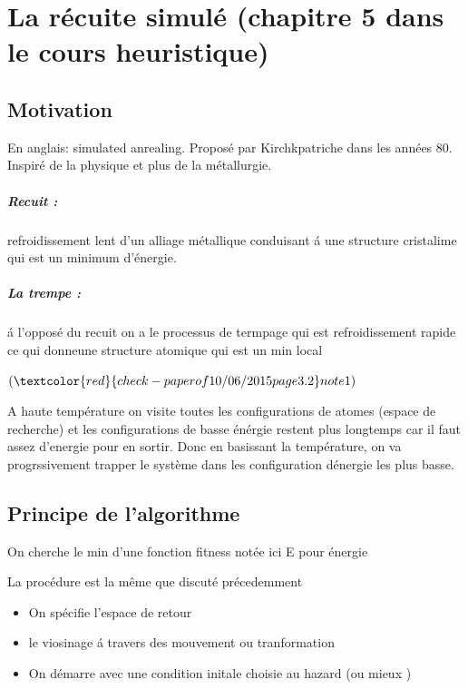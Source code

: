 \chapter{La r\'ecuite simul\'e (chapitre 5 dans le cours heuristique)}

\section{Motivation}

En anglais: simulated anrealing. 
Propos\'e par Kirchkpatriche dans les ann\'ees 80.
Inspir\'e de la physique et plus de la m\'etallurgie.

\paragraph{Recuit :}
refroidissement lent d'un alliage m\'etallique conduisant \'a une structure cristalime qui est un minimum d'\'energie.

\paragraph{La trempe :} \'a l'oppos\'e du recuit on a le processus de termpage qui est refroidissement rapide ce qui donneune structure atomique qui est un min local 


$(\textcolor{red}{check- paper of 10/06/2015 page 3.2 } note 1)$ 

A haute temp\'erature on visite toutes les configurations de atomes (espace de recherche) et les configurations de basse \'en\'ergie restent plus longtemps car il faut assez d'energie pour en sortir.
Donc en basissant la temp\'erature, on va progrssivement trapper le syst\`eme dans les configuration d\'energie les plus basse.

\section{Principe de l'algorithme}
On cherche le min d'une fonction fitness not\'ee ici E pour \'energie

La proc\'edure est la m\^eme que discut\'e pr\'ecedemment 
\begin{itemize}
\item[\textbullet] On sp\'ecifie l'espace de retour
\item[\textbullet] le viosinage \'a travers des mouvement ou tranformation
\item[\textbullet] On d\'emarre avec une condition initale choisie au hazard (ou mieux )
\end{itemize}

